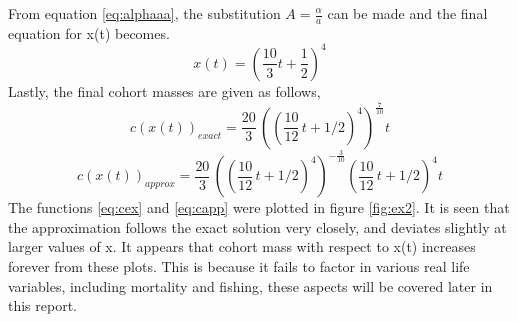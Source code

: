 \documentclass{article}
\numberwithin{equation}{section} %
\begin{document}
From equation \ref{eq:alphaaa},  the substitution $A = \frac{\alpha}{a}$ can be made and the final equation for x(t) becomes.
\begin{equation}\label{eq:finalxt}
    x(t)=\left(\frac{10}{3}t+\frac{1}{2}\right )^{4}
\end{equation}
Lastly, the final cohort masses are given as follows,
\begin{equation}\label{eq:cex}
    c(x(t))_{exact}= \frac{20}{3}\, \left(  \left(  \frac{10}{12}\,t+1/2 \right) ^{4}
 \right) ^{\frac{7}{10}}t
\end{equation}
\begin{equation}\label{eq:capp}
    c(x(t))_{approx}=\frac{20}{3}\, \left(  \left(  \frac{10}{12}\,t+1/2 \right) ^{4}
 \right) ^{- \frac{3}{10}} \left(  \frac{10}{12}\,t+1/2 \right) ^{4}t
\end{equation}
The functions \ref{eq:cex} and \ref{eq:capp} were plotted in figure \ref{fig:ex2}. It is seen that the approximation follows the exact solution very closely, and deviates slightly at larger values of x. It appears that cohort mass with respect to x(t) increases forever from these plots. This is because it fails to factor in various real life variables, including mortality and fishing, these aspects will be covered later in this report.
\end{document}
